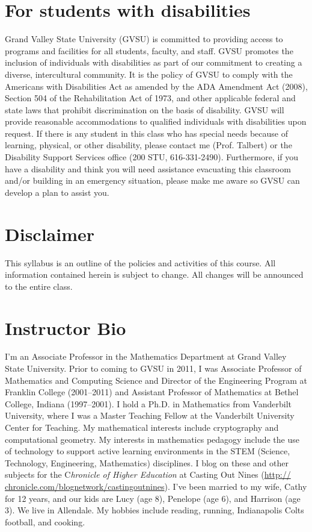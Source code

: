 \documentclass[11pt]{article}
\begin{document}
\section*{For students with disabilities}

Grand Valley State University (GVSU) is committed to providing access to programs and facilities for all students, faculty, and staff. GVSU promotes the inclusion of individuals with disabilities as part of our commitment to creating a diverse, intercultural community. It is the policy of GVSU to comply with the Americans with Disabilities Act as amended by the ADA Amendment Act (2008), Section 504 of the Rehabilitation Act of 1973, and other applicable federal and state laws that prohibit discrimination on the basis of disability. GVSU will provide reasonable accommodations to qualified individuals with disabilities upon request. If there is any student in this class who has special needs because of learning, physical, or other disability, please contact me (Prof. Talbert) or the Disability Support Services office (200 STU, 616-331-2490). Furthermore, if you have a disability and think you will need assistance evacuating this classroom and/or building in an emergency situation, please make me aware so GVSU can develop a plan to assist you.

	
\section*{Disclaimer}
This syllabus is an outline of the policies and activities of this course. All information contained herein is subject to change. All changes will be announced to the entire class. 

\section*{Instructor Bio}

I'm an Associate Professor in the Mathematics Department at Grand Valley State University. Prior to coming to GVSU in 2011, I was Associate Professor of Mathematics and Computing Science and Director of the Engineering Program at Franklin College (2001--2011) and Assistant Professor of Mathematics at Bethel College, Indiana (1997--2001). I hold a Ph.D. in Mathematics from Vanderbilt University, where I was a Master Teaching Fellow at the Vanderbilt University Center for Teaching. My mathematical interests include cryptography and computational geometry. My interests in mathematics pedagogy include the use of technology to support active learning environments in the STEM (Science, Technology, Engineering, Mathematics) disciplines. I blog on these and other subjects for the C\emph{hronicle of Higher Education} at Casting Out Nines (\url{http:// chronicle.com/blognetwork/castingoutnines}).  I've been married to my wife, Cathy for 12 years, and our kids are Lucy (age 8), Penelope (age 6), and Harrison (age 3). We live in Allendale. My hobbies include reading, running, Indianapolis Colts football, and cooking. 
\end{document}
